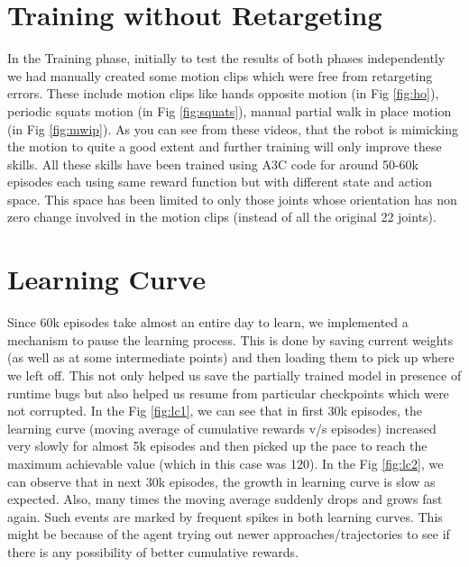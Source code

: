 \section{Training without Retargeting}
In the Training phase, initially to test the results of both phases independently we had manually created some motion clips which were free from retargeting errors. These include motion clips like hands opposite motion (in Fig \ref{fig:ho}), periodic squats motion (in Fig \ref{fig:squats}), manual partial walk in place motion (in Fig \ref{fig:mwip}). As you can see from these videos, that the robot is mimicking the motion to quite a good extent and further training will only improve these skills. All these skills have been trained using A3C code for around 50-60k episodes each using same reward function but with different state and action space. This space has been limited to only those joints whose orientation has non zero change involved in the motion clips (instead of all the original 22 joints). 

\section{Learning Curve}
Since 60k episodes take almost an entire day to learn, we implemented a mechanism to pause the learning process. This is done by saving current weights (as well as at some intermediate points) and then loading them to pick up where we left off. This not only helped us save the partially trained model in presence of runtime bugs but also helped us resume from particular checkpoints which were not corrupted. In the Fig \ref{fig:lc1}, we can see that in first 30k episodes, the learning curve (moving average of cumulative rewards v/s episodes) increased very slowly for almost 5k episodes and then picked up the pace to reach the maximum achievable value (which in this case was 120). In the Fig \ref{fig:lc2}, we can observe that in next 30k episodes, the growth in learning curve is slow as expected. Also, many times the moving average suddenly drops and grows fast again. Such events are marked by frequent spikes in both learning curves. This might be because of the agent trying out newer approaches/trajectories to see if there is any possibility of better cumulative rewards.

